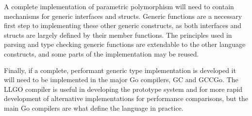 \documentclass[letterpaper,twocolumn,11pt]{article}
\begin{document}
A complete implementation of parametric polymorphism will need to contain mechanisms for generic interfaces and structs. Generic functions are a necessary first step to implementing these other generic constructs, as both interfaces and structs are largely defined by their member functions. The principles used in parsing and type checking generic functions are extendable to the other language constructs, and some parts of the implementation may be reused.

Finally, if a complete, performant generic type implementation is developed it will need to be implemented in the major Go compilers, GC and GCCGo. The LLGO compiler is useful in developing the prototype system and for more rapid development of alternative implementations for performance comparisons, but the main Go compilers are what define the language in practice.

{\footnotesize 
  

}
\end{document}

